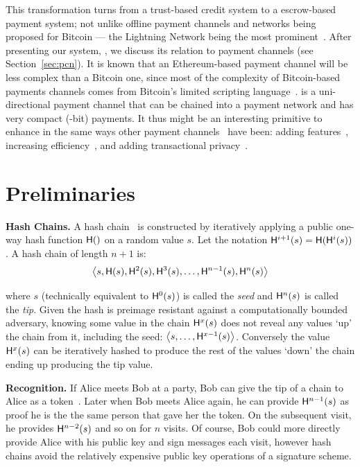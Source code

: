 This transformation turns \pw from a trust-based credit system to a escrow-based payment system; not unlike offline payment channels and networks being proposed for Bitcoin --- the Lightning Network being the most prominent~\cite{PD15}. After presenting our system, \ew, we discuss its relation to payment channels (see Section~\ref{sec:pcn}). It is known that an Ethereum-based payment channel will be less complex than a Bitcoin one, since most of the complexity of Bitcoin-based payments channels comes from Bitcoin's limited scripting language~\cite{MMSH16}. \ew is a uni-directional payment channel that can be chained into a payment network and has very compact (-bit) payments. It thus might be an interesting primitive to enhance in the same ways other payment channels~\cite{DW15,PD15} have been: adding features~\cite{KG17}, increasing efficiency~\cite{DEFM17,MBKM17}, and adding transactional privacy~\cite{GM17,MMK+17,HAB+17,RMKG18}.


\section{Preliminaries}

\textbf{Hash Chains.} A hash chain~\cite{Lam81} is constructed by iteratively applying a public one-way hash function $\mathsf{H}()$ on a random value $s$. Let the notation $\mathsf{H}^{i+1}(s) = \mathsf{H}(\mathsf{H}^{i}(s))$. A hash chain of length $n+1$ is:
\begin{equation*} \left \langle s,\mathsf{H}(s),\mathsf{H}^{2}(s),\mathsf{H}^{3}(s),\ldots,\mathsf{H}^{n-1}(s),\mathsf{H}^{n}(s) \right \rangle \end{equation*}

where $s$ (technically equivalent to $\mathsf{H}^{0}(s)$) is called the \textit{seed} and $\mathsf{H}^{n}(s)$ is called the \textit{tip}. Given the hash is preimage resistant against a computationally bounded adversary, knowing some value in the chain $\mathsf{H}^{x}(s)$ does not reveal any values `up' the chain from it, including the seed: $\left \langle s,\ldots,\mathsf{H}^{x-1}(s) \right \rangle$. Conversely the value $\mathsf{H}^{x}(s)$ can be iteratively hashed to produce the rest of the values `down' the chain ending up producing the tip value. 

\textbf{Recognition.} If Alice meets Bob at a party, Bob can give the tip of a chain to Alice as a token~\cite{ABC+98}. Later when Bob meets Alice again, he can provide $\mathsf{H}^{n-1}(s)$ as proof he is the the same person that gave her the token. On the subsequent visit, he provides $\mathsf{H}^{n-2}(s)$ and so on for $n$ visits. Of course, Bob could more directly provide Alice with his public key and sign messages each visit, however hash chains avoid the relatively expensive public key operations of a signature scheme.


